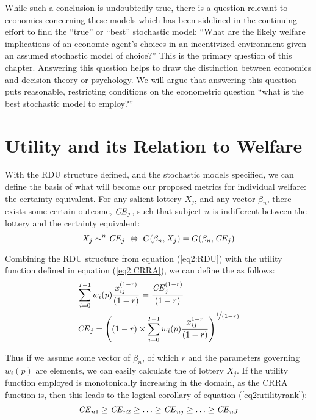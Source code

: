 \documentclass[../main.tex]{subfiles}
\begin{document}
While such a conclusion is undoubtedly true, there is a question relevant to economics concerning these models which has been sidelined in the continuing effort to find the \enquote{true} or \enquote{best} stochastic model: \enquote{What are the likely welfare implications of an economic agent's choices in an incentivized environment given an assumed stochastic model of choice?} This is the primary question of this chapter.
Answering this question helps to draw the distinction between economics and decision theory or psychology.
We will argue that answering this question puts reasonable, restricting conditions on the econometric question \enquote{what is the best stochastic model to employ?}

\section{Utility and its Relation to Welfare}

With the RDU structure defined, and the stochastic models specified, we can define the basis of what will become our proposed metrics for individual welfare: the certainty equivalent.
For any salient lottery $X_j$, and any vector $\beta_n$, there exists some certain outcome, $\mathit{CE}_j$, such that subject $n$ is indifferent between the lottery and the certainty equivalent:
\begin{equation}
	\label{eq2:CE.indiff}
	X_j \sim^n {\mathit{CE}}_j \;\Leftrightarrow\; G(\beta_n,X_j) = G(\beta_n, {\mathit{CE}}_j)
\end{equation}

Combining the RDU structure from equation (\ref{eq2:RDU}) with the utility function defined in equation (\ref{eq2:CRRA}), we can define the {\CE} as follows:
\begin{align}
	\label{eq2:CEcalc}
	\begin{split}
		&\sum_{i=0}^{I-1} w_i(p) \frac{x_{ij}^{(1-r)}}{(1-r)} = \frac{ {\mathit{CE}}_j^{(1-r)}}{(1-r)}\\
		&{\mathit{CE}}_j =  \left( (1-r) \times \sum_{i=0}^{I-1} w_i(p) \frac{x_{ij}^{1-r}}{(1-r)} \right)^{ \displaystyle\nicefrac{1}{(1-r)} }
	\end{split}
\end{align}

Thus if we assume some vector of $\beta_n$, of which $r$ and the parameters governing $w_i(p)$ are elements, we can easily calculate the {\CE} of lottery $X_j$.{\footnotemark}
If the utility function employed is monotonically increasing in the domain, as the CRRA function is, then this leads to the  logical corollary of equation (\ref{eq2:utilityrank}):
\begin{equation}
	\label{eq2:CErank}
	{\ensuremath{\mathit{CE}}}_{n1} \geq {\ensuremath{\mathit{CE}}}_{n2} \geq \ldots \geq {\ensuremath{\mathit{CE}}}_{nj} \geq \ldots \geq {\ensuremath{\mathit{CE}}}_{nJ}
\end{equation}
\end{document}
